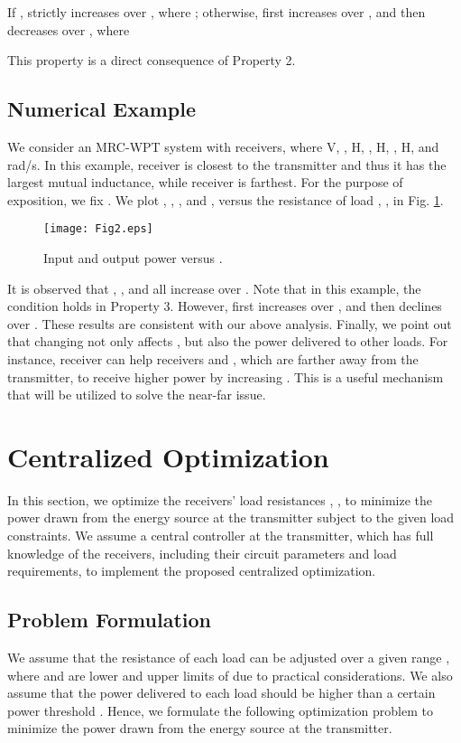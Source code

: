\documentclass[onecolumn, a4size, 11pt]{IEEEtran}
\begin{document}
\begin{property} \label{Prop:5}
If ,     strictly increases over , where 
; 
otherwise,     first increases over   ,  and then decreases over , where  

\end{property}

This property is a direct consequence of Property 2. 
\subsection{Numerical Example}
 \label{subsec:NumericalExample-Performnce}
We consider an MRC-WPT system with   receivers, where  V, , H, ,  H,  ,  H, and rad/s. 
In this example, receiver   is closest to the transmitter and thus it has the largest mutual inductance,  while receiver   is  farthest.  
For the purpose of exposition,  we fix  .  We plot   ,  , , and   ,  versus the resistance of  load , ,  in Fig.  \ref{fig:Eff-Pl-versus-rL1}. 
\begin{figure}
\centering
\texttt{[image: Fig2.eps]}
\caption{Input and output power versus .} 
\label{fig:Eff-Pl-versus-rL1} 
\end{figure}
It is observed that  , ,  and   all increase over . Note that in this example, the condition   holds in Property 3. 
However,    first increases over , and then  declines  over . These results are consistent with our above analysis.  
Finally, we point out that changing  not only affects , but also  the power delivered to other loads.   For instance,   receiver  can help  receivers  and , which are farther away from the transmitter,  to receive higher power by increasing  . This is a useful mechanism that will be utilized to solve the near-far issue.
\section{Centralized Optimization} 
In this section, we  optimize the receivers' load  resistances  , ,   to minimize the power drawn from the energy source at the transmitter subject  to the given load constraints. 
We assume a  central controller at the transmitter, which  has full knowledge of the receivers, including their circuit   parameters and load  requirements,  to implement the proposed centralized optimization. 
\subsection{Problem Formulation}
We  assume that the resistance of each load   can be adjusted over a given range , where  and  are  lower and upper limits of  due to practical considerations. 
We also assume  that the power delivered to each load  should be  higher than a certain power threshold  .  
Hence, we formulate the following optimization problem  to minimize the power drawn from the energy source at the transmitter.
 
\end{document}
